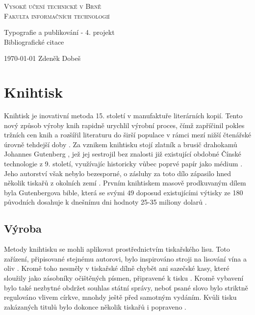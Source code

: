 \documentclass[10pt,a4paper]{article}
\begin{document}
\begin{titlepage}
    \begin{center}
        \textsc{\Huge Vysoké učení technické v Brně             
        \bigskip \\}
        \textsc{\huge Fakulta informačních technologií}
        
        {\LARGE Typografie a publikování - 4. projekt \\
            \vspace{0.3em}
        \Huge Bibliografické citace}
        
        {\Large \today \hfill 
        Zdeněk Dobeš}
    \end{center}
\end{titlepage}

\section*{Knihtisk}

Knihtisk je inovativní metoda 15. století v manufaktuře literárních kopií. Tento nový způsob výroby knih rapidně urychlil výrobní proces, čímž zapříčinil pokles tržních cen knih a rozšířil literaturu do širší populace v rámci mezí nižší čtenářské úrovně tehdejší doby \cite{Voit}. Za vznikem knihtisku stojí zlatník a brusič drahokamů Johannes Gutenberg \cite{JG}, jež jej sestrojil bez znalosti již existující obdobné Čínské technologie z 9. století, využívajíc historicky vůbec poprvé papír jako médium \cite{rep}. Jeho autorství však nebylo bezesporné, o zásluhy za toto dílo zápasilo hned několik tiskařů z okolních zemí \cite{MM}. Prvním knihtiskem masově prodkuvaným dílem byla Gutenbergova bible, která se svými 49 doposud existujícími výtisky ze 180 původních dosahuje k dnešnímu dni hodnoty 25-35 miliony dolarů \cite{history}.

\subsection*{Výroba}
Metody knihtisku se mohli aplikovat prostřednictvím tiskařského lisu. Toto zařízení, připisované stejnému autorovi, bylo inspirováno stroji na lisování vína a oliv \cite{Tisk_lis}. Kromě toho nesměly v tiskařské dílně chybět ani sazečské kasy, které sloužily jako zásobníky očištěných písmen, připravené k tisku \cite{Sazec}. Kromě vybavení bylo také nezbytné obdržet souhlas státní správy, neboť psané slovo bylo striktně regulováno vlivem církve, mnohdy ještě před samotným vydáním. Kvůli tisku zakázaných titulů bylo dokonce několik tiskařů i popraveno \cite{IF}.
\end{document}
